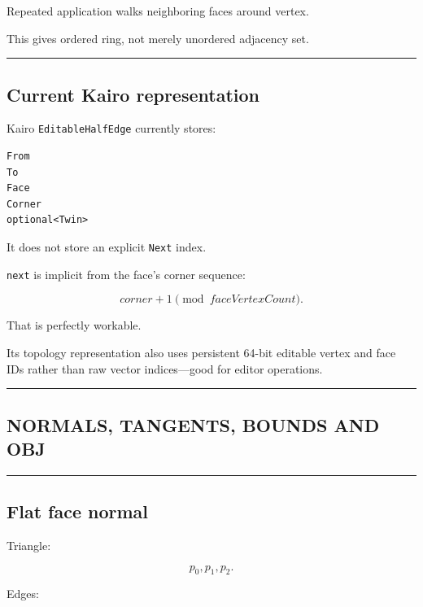 Repeated application walks neighboring faces around vertex.

This gives ordered ring, not merely unordered adjacency set.

\begin{center}\rule{0.5\linewidth}{0.5pt}\end{center}

\subsection{Current Kairo representation}\label{04-visual-computing-ii-ch041-current-kairo-representation}

Kairo \texttt{EditableHalfEdge} currently stores:

\begin{verbatim}
From
To
Face
Corner
optional<Twin>
\end{verbatim}

It does not store an explicit \texttt{Next} index.

\texttt{next} is implicit from the face's corner sequence:

\[
corner+1\pmod{faceVertexCount}.
\]

That is perfectly workable.

Its topology representation also uses persistent 64-bit editable vertex and face IDs rather than raw vector indices---good for editor operations.

\begin{center}\rule{0.5\linewidth}{0.5pt}\end{center}

\subsection{NORMALS, TANGENTS, BOUNDS AND OBJ}\label{04-visual-computing-ii-ch041-normals-tangents-bounds-and-obj}

\begin{center}\rule{0.5\linewidth}{0.5pt}\end{center}

\subsection{Flat face normal}\label{04-visual-computing-ii-ch041-flat-face-normal}

Triangle:

\[
p_0,p_1,p_2.
\]

Edges:

